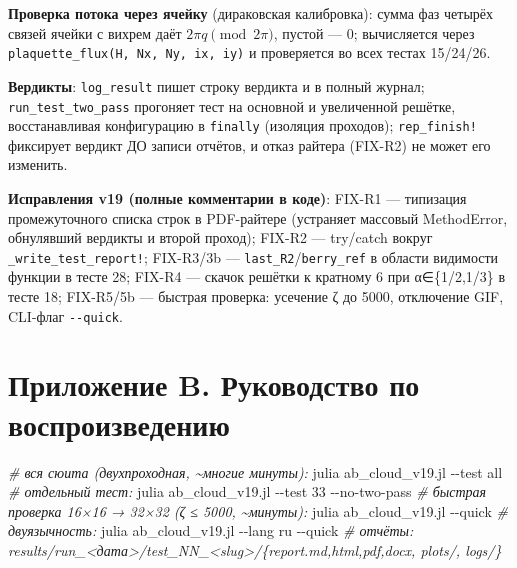 \documentclass[
]{article}
\newenvironment{Shaded}{}{}
\newcommand{\AttributeTok}[1]{\textcolor[rgb]{0.49,0.56,0.16}{#1}}
\newcommand{\CommentTok}[1]{\textcolor[rgb]{0.38,0.63,0.69}{\textit{#1}}}
\newcommand{\ExtensionTok}[1]{#1}
\newcommand{\NormalTok}[1]{#1}
\begin{document}
\textbf{Проверка потока через ячейку} (дираковская калибровка): сумма
фаз четырёх связей ячейки с вихрем даёт \(2\pi q \pmod{2\pi}\), пустой
--- 0; вычисляется через \texttt{plaquette\_flux(H,\ Nx,\ Ny,\ ix,\ iy)}
и проверяется во всех тестах 15/24/26.

\textbf{Вердикты}: \texttt{log\_result} пишет строку вердикта и в полный
журнал; \texttt{run\_test\_two\_pass} прогоняет тест на основной и
увеличенной решётке, восстанавливая конфигурацию в \texttt{finally}
(изоляция проходов); \texttt{rep\_finish!} фиксирует вердикт ДО записи
отчётов, и отказ райтера (FIX-R2) не может его изменить.

\textbf{Исправления v19 (полные комментарии в коде)}: FIX-R1 ---
типизация промежуточного списка строк в PDF-райтере (устраняет массовый
MethodError, обнулявший вердикты и второй проход); FIX-R2 --- try/catch
вокруг \texttt{\_write\_test\_report!}; FIX-R3/3b ---
\texttt{last\_R2}/\texttt{berry\_ref} в области видимости функции в
тесте 28; FIX-R4 --- скачок решётки к кратному 6 при α∈\{1/2,1/3\} в
тесте 18; FIX-R5/5b --- быстрая проверка: усечение ζ до 5000, отключение
GIF, CLI-флаг \texttt{-\/-quick}.

\section{Приложение B. Руководство по
воспроизведению}\label{ux43fux440ux438ux43bux43eux436ux435ux43dux438ux435-b.-ux440ux443ux43aux43eux432ux43eux434ux441ux442ux432ux43e-ux43fux43e-ux432ux43eux441ux43fux440ux43eux438ux437ux432ux435ux434ux435ux43dux438ux44e}

\begin{Shaded}
\begin{Highlighting}[]
\CommentTok{\# вся сюита (двухпроходная, \textasciitilde{}многие минуты):}
\ExtensionTok{julia}\NormalTok{ ab\_cloud\_v19.jl }\AttributeTok{{-}{-}test}\NormalTok{ all}
\CommentTok{\# отдельный тест:}
\ExtensionTok{julia}\NormalTok{ ab\_cloud\_v19.jl }\AttributeTok{{-}{-}test}\NormalTok{ 33 }\AttributeTok{{-}{-}no{-}two{-}pass}
\CommentTok{\# быстрая проверка 16×16 → 32×32 (ζ ≤ 5000, \textasciitilde{}минуты):}
\ExtensionTok{julia}\NormalTok{ ab\_cloud\_v19.jl }\AttributeTok{{-}{-}quick}
\CommentTok{\# двуязычность:}
\ExtensionTok{julia}\NormalTok{ ab\_cloud\_v19.jl }\AttributeTok{{-}{-}lang}\NormalTok{ ru }\AttributeTok{{-}{-}quick}
\CommentTok{\# отчёты: results/run\_\textless{}дата\textgreater{}/test\_NN\_\textless{}slug\textgreater{}/\{report.md,html,pdf,docx, plots/, logs/\}}
\end{Highlighting}
\end{Shaded}
\end{document}
